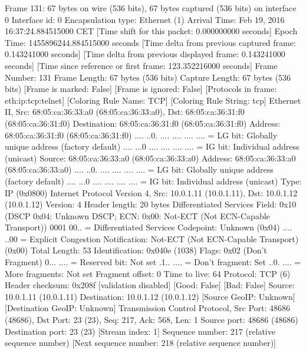 Frame 131: 67 bytes on wire (536 bits), 67 bytes captured (536 bits) on interface 0
    Interface id: 0
    Encapsulation type: Ethernet (1)
    Arrival Time: Feb 19, 2016 16:37:24.884515000 CET
    [Time shift for this packet: 0.000000000 seconds]
    Epoch Time: 1455896244.884515000 seconds
    [Time delta from previous captured frame: 0.143241000 seconds]
    [Time delta from previous displayed frame: 0.143241000 seconds]
    [Time since reference or first frame: 123.352216000 seconds]
    Frame Number: 131
    Frame Length: 67 bytes (536 bits)
    Capture Length: 67 bytes (536 bits)
    [Frame is marked: False]
    [Frame is ignored: False]
    [Protocols in frame: eth:ip:tcp:telnet]
    [Coloring Rule Name: TCP]
    [Coloring Rule String: tcp]
Ethernet II, Src: 68:05:ca:36:33:a0 (68:05:ca:36:33:a0), Dst: 68:05:ca:36:31:f0 (68:05:ca:36:31:f0)
    Destination: 68:05:ca:36:31:f0 (68:05:ca:36:31:f0)
        Address: 68:05:ca:36:31:f0 (68:05:ca:36:31:f0)
        .... ..0. .... .... .... .... = LG bit: Globally unique address (factory default)
        .... ...0 .... .... .... .... = IG bit: Individual address (unicast)
    Source: 68:05:ca:36:33:a0 (68:05:ca:36:33:a0)
        Address: 68:05:ca:36:33:a0 (68:05:ca:36:33:a0)
        .... ..0. .... .... .... .... = LG bit: Globally unique address (factory default)
        .... ...0 .... .... .... .... = IG bit: Individual address (unicast)
    Type: IP (0x0800)
Internet Protocol Version 4, Src: 10.0.1.11 (10.0.1.11), Dst: 10.0.1.12 (10.0.1.12)
    Version: 4
    Header length: 20 bytes
    Differentiated Services Field: 0x10 (DSCP 0x04: Unknown DSCP; ECN: 0x00: Not-ECT (Not ECN-Capable Transport))
        0001 00.. = Differentiated Services Codepoint: Unknown (0x04)
        .... ..00 = Explicit Congestion Notification: Not-ECT (Not ECN-Capable Transport) (0x00)
    Total Length: 53
    Identification: 0x040e (1038)
    Flags: 0x02 (Don't Fragment)
        0... .... = Reserved bit: Not set
        .1.. .... = Don't fragment: Set
        ..0. .... = More fragments: Not set
    Fragment offset: 0
    Time to live: 64
    Protocol: TCP (6)
    Header checksum: 0x208f [validation disabled]
        [Good: False]
        [Bad: False]
    Source: 10.0.1.11 (10.0.1.11)
    Destination: 10.0.1.12 (10.0.1.12)
    [Source GeoIP: Unknown]
    [Destination GeoIP: Unknown]
Transmission Control Protocol, Src Port: 48686 (48686), Dst Port: 23 (23), Seq: 217, Ack: 568, Len: 1
    Source port: 48686 (48686)
    Destination port: 23 (23)
    [Stream index: 1]
    Sequence number: 217    (relative sequence number)
    [Next sequence number: 218    (relative sequence number)]
